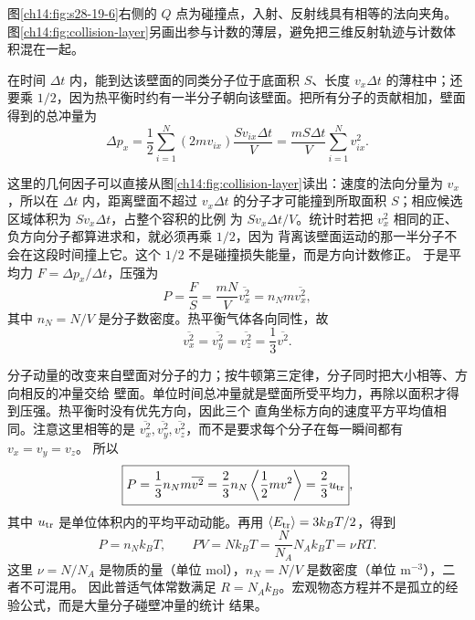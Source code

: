 {图\ref{ch14:fig:s28-19-6}右侧的 $Q$ 点为碰撞点，入射、反射线具有相等的法向夹角。
图\ref{ch14:fig:collision-layer}另画出参与计数的薄层，避免把三维反射轨迹与计数体积混在一起。
\gasWallCollisionDiagram

在时间 $\Delta t$ 内，能到达该壁面的同类分子位于底面积 $S$、长度 $v_x\Delta t$ 的薄柱中；还要乘
$1/2$，因为热平衡时约有一半分子朝向该壁面。把所有分子的贡献相加，壁面得到的总冲量为
\begin{equation}
  \Delta p_x=\frac12\sum_{i=1}^N(2mv_{ix})
  \frac{Sv_{ix}\Delta t}{V}
  =\frac{mS\Delta t}{V}\sum_{i=1}^Nv_{ix}^2.
\end{equation}

这里的几何因子可以直接从图\ref{ch14:fig:collision-layer}读出：速度的法向分量为 $v_x$，所以在 $\Delta t$ 内，距离壁面不超过
$v_x\Delta t$ 的分子才可能撞到所取面积 $S$；相应候选区域体积为 $Sv_x\Delta t$，占整个容积的比例
为 $Sv_x\Delta t/V$。统计时若把 $v_x^2$ 相同的正、负方向分子都算进求和，就必须再乘 $1/2$，因为
背离该壁面运动的那一半分子不会在这段时间撞上它。这个 $1/2$ 不是碰撞损失能量，而是方向计数修正。
于是平均力 $F=\Delta p_x/\Delta t$，压强为
\begin{equation}
  \boxed{P=\frac FS=\frac{mN}{V}\overline{v_x^2}
  =n_Nm\overline{v_x^2}},
\end{equation}
其中 $n_N=N/V$ 是分子数密度。热平衡气体各向同性，故
\begin{equation}
  \overline{v_x^2}=\overline{v_y^2}=\overline{v_z^2}
  =\frac13\overline{v^2}.
\end{equation}

分子动量的改变来自壁面对分子的力；按牛顿第三定律，分子同时把大小相等、方向相反的冲量交给
壁面。单位时间总冲量就是壁面所受平均力，再除以面积才得到压强。热平衡时没有优先方向，因此三个
直角坐标方向的速度平方平均值相同。注意这里相等的是 $\overline{v_x^2},\overline{v_y^2},
\overline{v_z^2}$，而不是要求每个分子在每一瞬间都有 $v_x=v_y=v_z$。
所以
\begin{equation}
  \boxed{P=\frac13n_Nm\overline{v^2}
  =\frac23n_N\left\langle\frac12mv^2\right\rangle
  =\frac23u_{\rm tr}},
\end{equation}
其中 $u_{\rm tr}$ 是单位体积内的平均平动动能。再用
$\langle E_{\rm tr}\rangle=3k_BT/2$，得到
\begin{equation}
  \boxed{P=n_Nk_BT},
  \qquad
  \boxed{PV=Nk_BT=\frac{N}{N_A}N_Ak_BT=\nu RT}.
\end{equation}
这里 $\nu=N/N_A$ 是物质的量（单位 $\mathrm{mol}$），$n_N=N/V$ 是数密度（单位 $\mathrm{m^{-3}}$），二者不可混用。
因此普适气体常数满足 $R=N_Ak_B$。宏观物态方程并不是孤立的经验公式，而是大量分子碰壁冲量的统计
结果。

}
